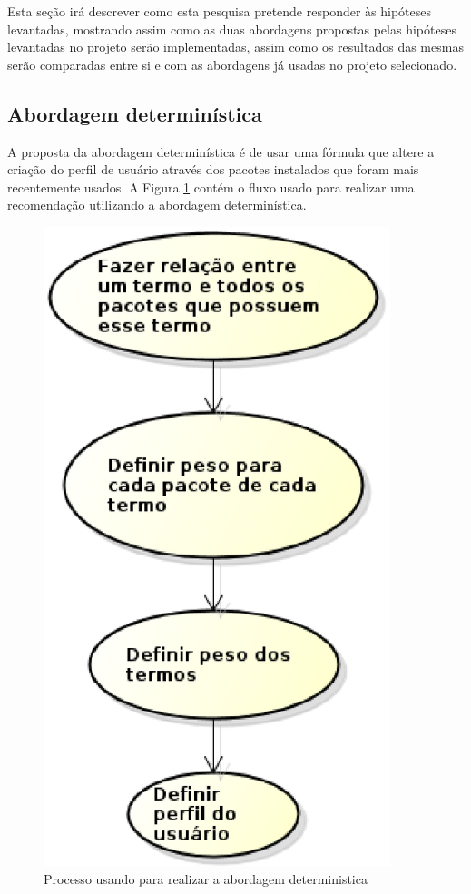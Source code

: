 Esta seção irá descrever como esta pesquisa pretende responder às hipóteses
levantadas, mostrando assim como as duas abordagens propostas pelas hipóteses
levantadas no projeto serão implementadas, assim como os resultados das mesmas
serão comparadas entre si e com as abordagens já usadas no projeto selecionado.

\subsection{Abordagem determinística}

A proposta da abordagem determinística é de usar uma fórmula que altere
a criação do perfil de usuário através dos pacotes instalados que foram mais
recentemente usados. A Figura \ref{fig:abordagem_deterministica}
contém o fluxo usado para realizar uma
recomendação utilizando a abordagem determinística.

\begin{figure}[h]
  \centering
  \includegraphics[width=0.9\textwidth]{figuras/abordagem_deterministica.eps}
  \caption{Processo usando para realizar a abordagem deterministica}
  \label{fig:abordagem_deterministica}
\end{figure}

